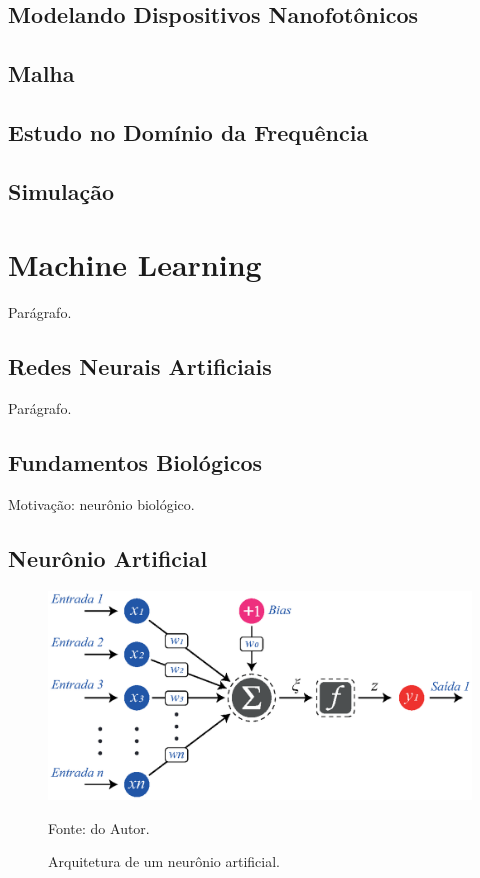 \subsection{Modelando Dispositivos Nanofotônicos}      \label{Modelando COMSOL}

\subsection{Malha}

\subsection{Estudo no Domínio da Frequência}

\subsection{Simulação}


\section{Machine Learning}

Parágrafo.

\subsection{Redes Neurais Artificiais}

Parágrafo.


\subsection{Fundamentos Biológicos}

Motivação: neurônio biológico.

\subsection{Neurônio Artificial}

\begin{figure}[H]
    \centering
    \includegraphics{04-Figuras/ArtificialNeuronModel.eps}
    \caption{Arquitetura de um neurônio artificial.} \par
    Fonte: do Autor.
    \label{figura: ArtificialNeuronModel}
\end{figure}




